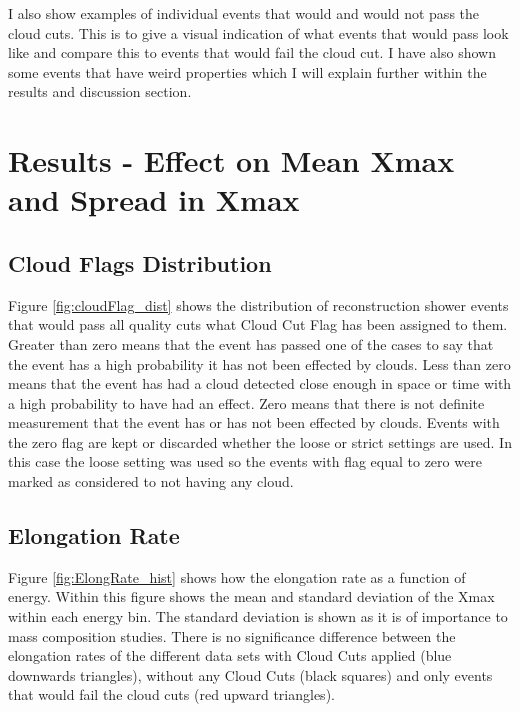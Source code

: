 I also show examples of individual events that would and would not pass the cloud cuts. This is to give a visual indication of what events that would pass look like and compare this to events that would fail the cloud cut. I have also shown some events that have weird properties which I will explain further within the results and discussion section.


\section{Results - Effect on Mean Xmax and Spread in Xmax}

%
%
%

\subsection{Cloud Flags Distribution}

Figure \ref{fig:cloudFlag_dist} shows the distribution of reconstruction shower events that would pass all quality cuts what Cloud Cut Flag has been assigned to them. Greater than zero means that the event has passed one of the cases to say that the event has a high probability it has not been effected by clouds. Less than zero means that the event has had a cloud detected close enough in space or time with a high probability to have had an effect. Zero means that there is not definite measurement that the event has or has not been effected by clouds. Events with the zero flag are kept or discarded whether the loose or strict settings are used. In this case the loose setting was used so the events with flag equal to zero were marked as considered to not having any cloud.

\subsection{Elongation Rate}

Figure \ref{fig:ElongRate_hist} shows how the elongation rate as a function of energy. Within this figure shows the mean and standard deviation of the Xmax within each energy bin. The standard deviation is shown as it is of importance to mass composition studies. There is no significance difference between the elongation  rates of the different data sets with Cloud Cuts applied (blue downwards triangles), without any Cloud Cuts (black squares) and only events that would fail the cloud cuts (red upward triangles).

